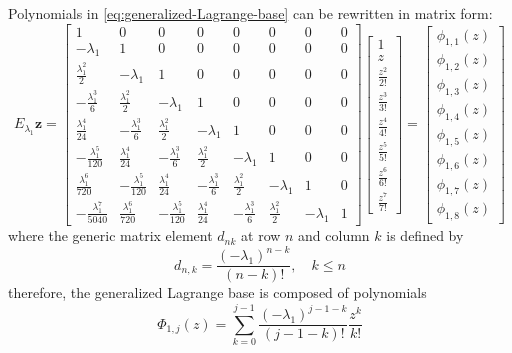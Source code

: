 Polynomials in \autoref{eq:generalized-Lagrange-base} can be rewritten in matrix form:
\begin{displaymath}
E_{\lambda_{1}}\boldsymbol{z} = \left[\begin{matrix}1 & 0 & 0 & 0 & 0 & 0 & 0 & 0\\- \lambda_{1} & 1 & 0 & 0 & 0 & 0 & 0 & 0\\\frac{\lambda_{1}^{2}}{2} & - \lambda_{1} & 1 & 0 & 0 & 0 & 0 & 0\\- \frac{\lambda_{1}^{3}}{6} & \frac{\lambda_{1}^{2}}{2} & - \lambda_{1} & 1 & 0 & 0 & 0 & 0\\\frac{\lambda_{1}^{4}}{24} & - \frac{\lambda_{1}^{3}}{6} & \frac{\lambda_{1}^{2}}{2} & - \lambda_{1} & 1 & 0 & 0 & 0\\- \frac{\lambda_{1}^{5}}{120} & \frac{\lambda_{1}^{4}}{24} & - \frac{\lambda_{1}^{3}}{6} & \frac{\lambda_{1}^{2}}{2} & - \lambda_{1} & 1 & 0 & 0\\\frac{\lambda_{1}^{6}}{720} & - \frac{\lambda_{1}^{5}}{120} & \frac{\lambda_{1}^{4}}{24} & - \frac{\lambda_{1}^{3}}{6} & \frac{\lambda_{1}^{2}}{2} & - \lambda_{1} & 1 & 0\\- \frac{\lambda_{1}^{7}}{5040} & \frac{\lambda_{1}^{6}}{720} & - \frac{\lambda_{1}^{5}}{120} & \frac{\lambda_{1}^{4}}{24} & - \frac{\lambda_{1}^{3}}{6} & \frac{\lambda_{1}^{2}}{2} & - \lambda_{1} & 1\end{matrix}\right] \left[\begin{matrix}1\\z\\\frac{z^{2}}{2!}\\\frac{z^{3}}{3!}\\\frac{z^{4}}{4!}\\\frac{z^{5}}{5!}\\\frac{z^{6}}{6!}\\\frac{z^{7}}{7!}\end{matrix}\right] = \left[\begin{matrix}\phi_{ 1, 1 }{\left (z \right )}\\\phi_{ 1, 2 }{\left (z \right )}\\\phi_{ 1, 3 }{\left (z \right )}\\\phi_{ 1, 4 }{\left (z \right )}\\\phi_{ 1, 5 }{\left (z \right )}\\\phi_{ 1, 6 }{\left (z \right )}\\\phi_{ 1, 7 }{\left (z \right )}\\\phi_{ 1, 8 }{\left (z \right )}\end{matrix}\right]
\end{displaymath}
where the generic matrix element $d_{nk}$ at row $n$ and column $k$ is defined by 
\begin{displaymath}
    d_{n,k} = \frac{\left(-\lambda_{1}\right)^{n-k}}{\left(n-k\right)!}, \quad k\leq n
\end{displaymath}
therefore, the generalized Lagrange base is composed of polynomials
\begin{displaymath}
  \Phi_{1,j}(z) = \sum_{k=0}^{j-1}{\frac{(-\lambda_{1})^{j-1-k}}{(j-1-k)!}\frac{z^{k}}{k!}}
\end{displaymath}

